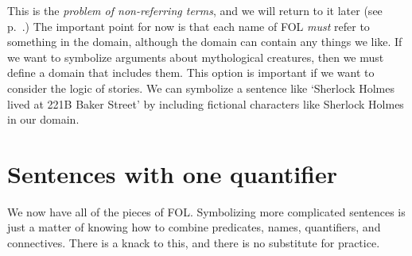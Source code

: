 This is the \emph{problem of non-referring terms}, and we will return to it later (see p.~\pageref{subsec.defdesc}.) The important point for now is that each name of FOL \emph{must} refer to something in the domain, although the domain can contain any things we like. If we want to symbolize arguments about mythological creatures, then we must define a domain that includes them. This option is important if we want to consider the logic of stories. We can symbolize a sentence like `Sherlock Holmes lived at 221B Baker Street' by including fictional characters like Sherlock Holmes in our domain.

\chapter{Sentences with one quantifier}
\label{s:MoreMonadic}

We now have all of the pieces of FOL. Symbolizing more complicated sentences is just a matter of knowing how to combine predicates, names, quantifiers, and connectives. There is a knack to this, and there is no substitute for practice.

